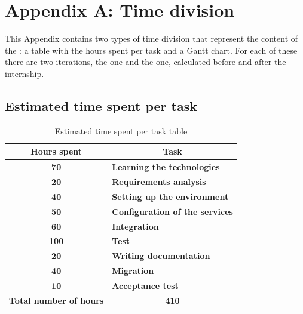 \renewcommand\thechapter{A}
\chapter{Appendix A: Time division}
\label{AppendixA}

This Appendix contains two types of time division that represent the content of the : a table with the hours spent per task and a Gantt chart.
For each of these there are two iterations, the  one and the  one, calculated before and after the internship.

\section{Estimated time spent per task}
	\begin{table}[H]
		\begin{tabularx}{\textwidth}{c|X}
			\centering\textbf{Hours spent} & \multicolumn{1}{c}{\textbf{Task}}\\\hline
			\textbf{70}&\textbf{Learning the technologies}\\\hline
			\textbf{20}&\textbf{Requirements analysis}\\\hline
			\textbf{40}&\textbf{Setting up the environment}\\\hline
			\textbf{50}&\textbf{Configuration of the services}\\\hline
			\textbf{60}&\textbf{Integration}\\\hline
			\textbf{100}&\textbf{Test}\\\hline
			\textbf{20}&\textbf{Writing documentation}\\\hline
			\textbf{40}&\textbf{Migration}\\\hline
			\textbf{10}&\textbf{Acceptance test}\\\hline
			\textbf{Total number of hours}&\multicolumn{1}{c}{\textbf{410}} \\	
		\end{tabularx}
		\caption{Estimated time spent per task table}
	\end{table}

